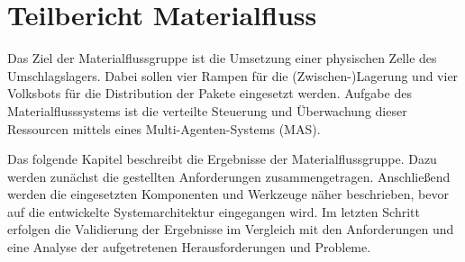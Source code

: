\section{Teilbericht Materialfluss}
Das Ziel der Materialflussgruppe ist die Umsetzung einer physischen Zelle des Umschlagslagers. Dabei sollen vier Rampen für die (Zwischen-)Lagerung und vier Volksbots für die Distribution der Pakete eingesetzt werden. Aufgabe des Materialflusssystems ist die verteilte Steuerung und Überwachung dieser Ressourcen mittels eines Multi-Agenten-Systems (MAS).

Das folgende Kapitel beschreibt die Ergebnisse der Materialflussgruppe. Dazu werden zunächst die gestellten Anforderungen zusammengetragen. Anschließend werden die eingesetzten Komponenten und Werkzeuge näher beschrieben, bevor auf die entwickelte Systemarchitektur eingegangen wird. Im letzten Schritt erfolgen die Validierung der Ergebnisse im Vergleich mit den Anforderungen und eine Analyse der aufgetretenen Herausforderungen und Probleme.











